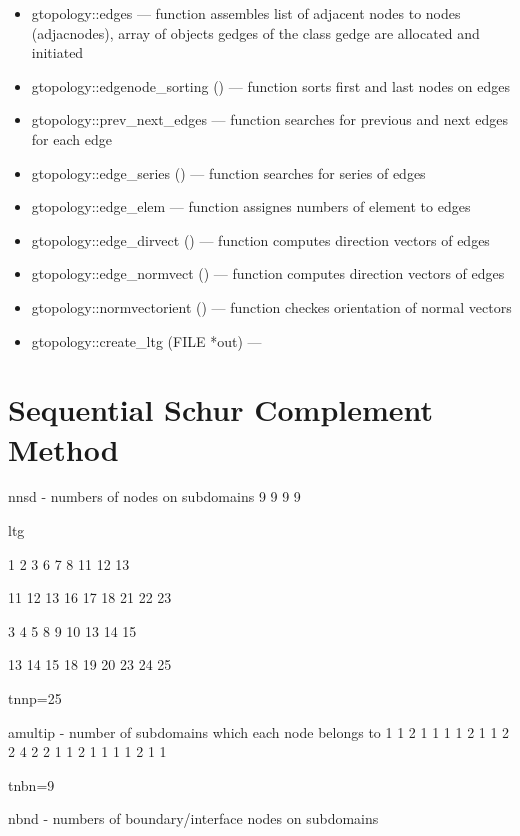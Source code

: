 \begin{itemize}
\item
gtopology::edges --- function assembles list of adjacent nodes to nodes (adjacnodes),
array of objects gedges of the class gedge are allocated and initiated
\item
gtopology::edgenode\_sorting () --- function sorts first and last nodes on edges
\item
gtopology::prev\_next\_edges --- function searches for previous and next edges for each edge
\item
gtopology::edge\_series () --- function searches for series of edges
\item
gtopology::edge\_elem --- function assignes numbers of element to edges
\item
gtopology::edge\_dirvect () --- function computes direction vectors of edges
\item
gtopology::edge\_normvect () --- function computes direction vectors of edges
\item
gtopology::normvectorient () --- function checkes orientation of normal vectors
\item
gtopology::create\_ltg (FILE *out) --- 
\end{itemize}


\section{Sequential Schur Complement Method}

nnsd - numbers of nodes on subdomains
9 9 9 9

ltg 

 1  2  3  6  7  8 11 12 13

11 12 13 16 17 18 21 22 23

 3  4  5  8  9 10 13 14 15

13 14 15 18 19 20 23 24 25

tnnp=25

amultip - number of subdomains which each node belongs to
 1 1 2 1 1 1 1 2 1 1 2 2 4 2 2 1 1 2 1 1 1 1 2 1 1

tnbn=9

nbnd  - numbers of boundary/interface nodes on subdomains

